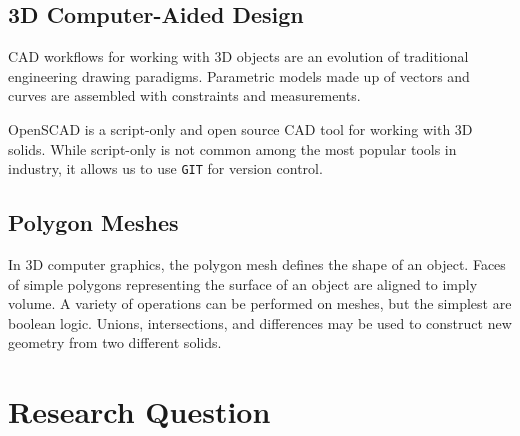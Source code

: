 \documentclass[sigconf]{acmart}
\begin{document}




\subsection{3D Computer-Aided Design}

CAD workflows for working with 3D objects are an evolution of traditional engineering drawing paradigms.
Parametric models made up of vectors and curves are assembled with constraints and measurements.

OpenSCAD is a script-only and open source CAD tool for working with 3D solids.
While script-only is not common among the most popular tools in industry, it allows us to use \texttt{GIT} for version control.


\subsection{Polygon Meshes}

In 3D computer graphics, the polygon mesh defines the shape of an object.
Faces of simple polygons representing the surface of an object are aligned to imply volume.
A variety of operations can be performed on meshes, but the simplest are boolean logic.
Unions, intersections, and differences may be used to construct new geometry from two different solids.

\section{Research Question}
\end{document}
